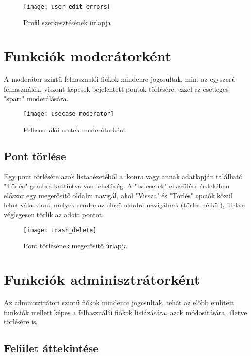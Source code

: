 \begin{figure}[H]
	\centering
	\texttt{[image: user\_edit\_errors]}
	\caption{Profil szerkesztésének űrlapja}
	\label{fig:user_edit_errors}
\end{figure}

\section{Funkciók moderátorként}

A moderátor szintű felhasználói fiókok mindenre jogosultak, mint az egyszerű felhasználók, viszont képesek bejelentett pontok törlésére, ezzel az esetleges "spam" moderálására.

\begin{figure}[H]
	\centering
	\texttt{[image: usecase\_moderator]}
	\caption{Felhasználói esetek moderátorként}
	\label{fig:usecase_moderator}
\end{figure}

\subsection{Pont törlése}
\label{subsec:trash_delete}

Egy pont törlésére azok listanézetéből a  ikonra vagy annak adatlapján található "Törlés" gombra kattintva van lehetőség. A "balesetek" elkerülése érdekében először egy megerősítő oldalra navigál, ahol "Vissza" és "Törlés" opciók közül lehet választani, melyek rendre az előző oldalra navigálnak (törlés nélkül), illetve véglegesen törlik az adott pontot.

\begin{figure}[H]
	\centering
	\texttt{[image: trash\_delete]}
	\caption{Pont törlésének megerősítő űrlapja}
	\label{fig:trash_delete}
\end{figure}

\section{Funkciók adminisztrátorként}

Az adminisztrátori szintű fiókok mindenre jogosultak, tehát az előbb említett funkciók mellett képes a felhasználói fiókok listázására, azok módosítására, illetve törlésére is.

\subsection{Felület áttekintése}
\label{subsec:nav_admin}

